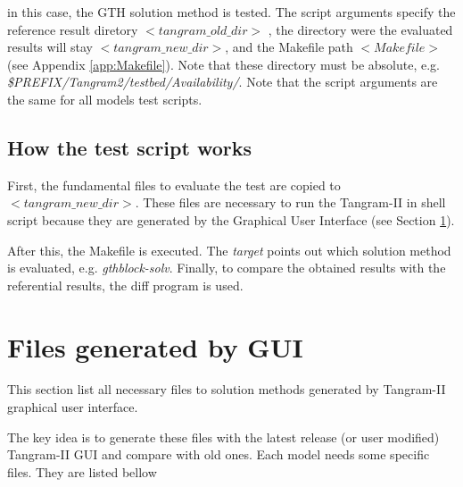 \documentclass[english]{article}
\begin{document}
in this case, the GTH solution method is tested. The script arguments specify the reference result diretory $<tangram\_old\_dir>$ , the directory were the evaluated results will stay $<tangram\_new\_dir>$, and the Makefile path $<Makefile>$ (see Appendix \ref{app:Makefile}). Note that these directory must be absolute, e.g. {\it \$PREFIX/Tangram2/testbed/Availability/}. Note that the script arguments are the same for all models test scripts.

\subsection{How the test script works}

First, the fundamental files to evaluate the test are copied to $<tangram\_new\_dir>$. These files are necessary to run the Tangram-II in shell script because they are generated by the Graphical User Interface
(see Section \ref{sec:interface}).

After this, the Makefile is executed. The {\it target} points out which solution method is evaluated, e.g. {\it gthblock-solv}. Finally, to compare the obtained results with the referential results, the diff program is used.

\section{Files generated by GUI}
\label{sec:interface}

This section list all necessary files to solution methods generated by Tangram-II graphical user interface. 

The key idea is to generate these files with the latest release (or user modified) Tangram-II GUI and compare with old ones. Each model needs some specific files. They are listed bellow
\end{document}
